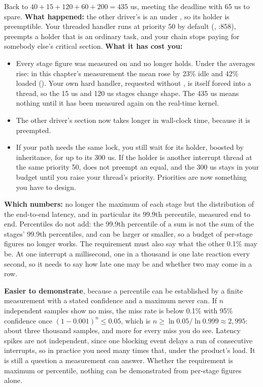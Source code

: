  Back to $40 + 15 + 120 + 60 + 200 = 435$ us, meeting the deadline with 65 us to spare.
\textbf{What happened:} the other driver's  is an  under
, so its holder is preemptible. Your threaded handler runs at 
priority 50 by default (, :858), preempts a
holder that is an ordinary task, and your chain stops paying for somebody else's critical section.
\textbf{What it has cost you:}
\begin{itemize}
  \item Every stage figure was measured on  and no longer holds. Under
     the averages rise: in this chapter's measurement the mean rose by 23\% idle
    and 42\% loaded (). Your own hard handler, requested without
    , is itself forced into a thread, so the 15 us and 120 us stages change
    shape. The 435 us means nothing until it has been measured again on the real-time kernel.
  \item The other driver's section now takes longer in wall-clock time, because it is preempted.
  \item If your path needs the same lock, you still wait for its holder, boosted by inheritance,
    for up to its 300 us. If the holder is another interrupt thread at the same priority 50,
     does not preempt an equal, and the 300 us stays in your budget until you raise
    your thread's priority. Priorities are now something you have to design.
\end{itemize}

 \textbf{Which numbers:} no longer the maximum of each stage but the distribution of the
end-to-end latency, and in particular its 99.9th percentile, measured end to end. Percentiles do
not add: the 99.9th percentile of a sum is not the sum of the stages' 99.9th percentiles, and can be
larger or smaller, so a budget of per-stage figures no longer works. The requirement must also say
what the other 0.1\% may be. At one interrupt a millisecond, one in a thousand is one late reaction
every second, so it needs to say how late one may be and whether two may come in a row.

\textbf{Easier to demonstrate}, because a percentile can be established by a finite measurement
with a stated confidence and a maximum never can. If $n$ independent samples show no miss, the
miss rate is below 0.1\% with 95\% confidence once $(1 - 0.001)^n \le 0.05$, which is
$n \ge \ln 0.05 / \ln 0.999 \approx 2{,}995$: about three thousand samples, and more for every miss
you do see. Latency spikes are not independent, since one blocking event delays a run of consecutive
interrupts, so in practice you need many times that, under the product's load. It is still a
question a measurement can answer. Whether the requirement is maximum or percentile, nothing can
be demonstrated from per-stage figures alone.

